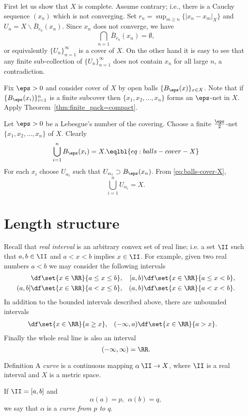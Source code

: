 First let us show that $X$ is complete.
Assume contrary;
i.e., there is a Cauchy sequence $(x_n)$ which is not converging.
Set $r_n=\sup_{m\ge n}\{|x_n-x_m|_X\}$ and
$U_n=X\backslash \bar B_{r_n}(x_n)$.
Since $x_n$ does not converge, we have $$\bigcap_{n=1}\bar B_{r_n}(x_n)=\emptyset,$$
or equivalently $\{U_n\}_{n=1}^\infty$ is a cover of $X$.
On the other hand it is easy to see that any finite sub-collection of $\{U_n\}_{n=1}^\infty$ does not contain $x_n$ for all large $n$, a contradiction. 


Fix $\eps>0$ and consider cover of $X$ by open balls $\{B_\eps(x)\}_{x\in X}$.
Note that if $\{B_\eps(x_i)\}_{i=1}^n$ is a finite subcover then $\{x_1,x_2,\dots,x_n\}$ forms an $\eps$-net in $X$. Apply Theorem~\ref{thm:finite_pack=compact}.

Let $\eps>0$ be a Lebesgue's number of the covering.
Choose a finite $\tfrac\eps2$-net $\{x_1,x_2,\dots,x_n\}$ of $X$.
Clearly 
$$\bigcup_{i=1}^n B_\eps(x_i)=X.\eqlbl{eq:balls-cover-X}$$
For each $x_i$ choose $U_{\alpha_i}$ such that $U_{\alpha_i}\supset B_\eps(x_n)$.
From \ref{eq:balls-cover-X}, 
$$\bigcup_{i=1}^n U_{\alpha_i}=X.$$
\qedsf


\section{Length structure}

Recall that \emph{real interval} is an arbitrary convex set of real line;
i.e. a set $\II$ such that $a,b\in \II$ and $a<x<b$ implies $x\in\II$.
For example, given two real numbers $a<b$ we may consider the following intervals
\begin{align*}
[a,b]
&\df
\set{x\in \RR}{a\le x\le b},
&
[a,b)
&\df
\set{x\in \RR}{a\le x< b},
\\
(a,b]
&\df
\set{x\in \RR}{a< x\le b},
&
(a,b)
&\df
\set{x\in \RR}{a< x< b}.
\end{align*}
In addition to the bounded intervals described above, there are unbounded intervals
\begin{align*}
[a,\infty)
&\df
\set{x\in \RR}{a\le x},
&
(a,\infty)
&\df
\set{x\in \RR}{a< x},
\\
(-\infty,a]
&\df
\set{x\in \RR}{a\ge x},
&
(-\infty,a)
&\df
\set{x\in \RR}{a> x}.
\end{align*}
Finally the whole real line is also an interval
$$(-\infty,\infty)=\RR.$$

\begin{thm}{Definition}\label{def:curve}
A \emph{curve} is a continuous mapping $\alpha\:\II\to X$,
where $\II$ is a real interval and $X$ is a metric space. 

If $\II=[a,b]$ and $$\alpha(a)=p,\ \ \alpha(b)=q,$$
we say that $\alpha$ is a \emph{curve from $p$ to $q$}.
\end{thm}

